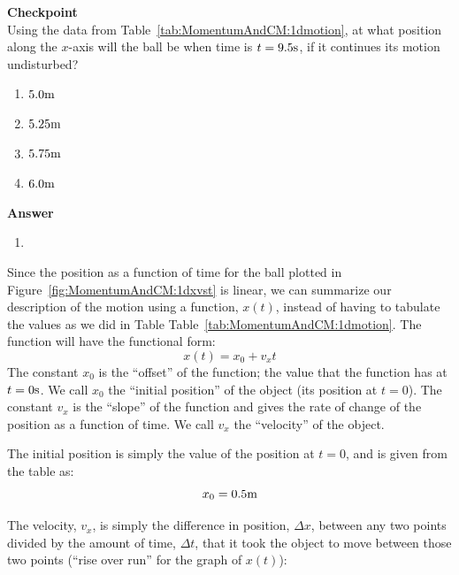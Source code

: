 \documentclass[9pt,arxiv,red]{lapreprint}
\begin{document}
\begin{framed}
\textbf{Checkpoint}\\
Using the data from Table~\ref{tab:MomentumAndCM:1dmotion}, at what position along the $x$-axis will the ball be when time is $t=9.5 {\rm s}$, if it continues its motion undisturbed?

\begin{enumerate}
\item $5.0 {\rm m}$
\item $5.25 {\rm m}$
\item $5.75 {\rm m}$
\item $6.0 {\rm m}$
\end{enumerate}

\begin{framed}
\textbf{Answer}\\
\begin{enumerate}[resume]
\item
\end{enumerate}
\end{framed}
\end{framed}

Since the position as a function of time for the ball plotted in Figure~\ref{fig:MomentumAndCM:1dxvst} is linear, we can summarize our description of the motion using a function, $x(t)$, instead of having to tabulate the values as we did in Table Table~\ref{tab:MomentumAndCM:1dmotion}. The function will have the functional form:
\begin{equation}
\label{eqn:MomentumAndCM:1dxvst_noa}
\boxed{x(t) = x_0 + v_x t}
\end{equation}
The constant $x_0$ is the ``offset'' of the function; the value that the function has at $t= 0 {\rm s}$. We call $x_0$ the ``initial position'' of the object (its position at $t=0$). The constant $v_x$ is the ``slope'' of the function and gives the rate of change of the position as a function of time. We call $v_x$ the ``velocity'' of the object.

The initial position is simply the value of the position at $t=0$, and is given from the table as:
\begin{equation}
x_0 = 0.5 {\rm m}
\end{equation}

The velocity, $v_x$, is simply the difference in position, $\Delta x$, between any two points divided by the amount of time, $\Delta t$, that it took the object to move between those two points (``rise over run'' for the graph of $x(t)$):
\end{document}
